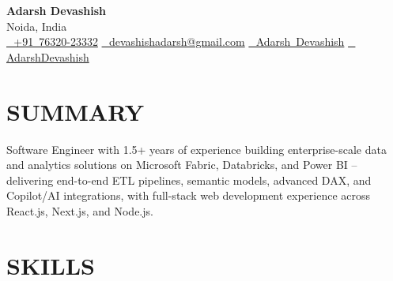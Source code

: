 \documentclass[10pt,letterpaper]{article}
\begin{document}
\begin{center}
    {\LARGE \textbf{Adarsh Devashish}}\\
    \vspace{0.15cm}
    {\small Noida, India}\\
    \vspace{0.2cm}
    \noindent
    \small
    \href{tel:+917632023332}{\raisebox{-0.2\height}{\Large \faPhoneSquare}\ \,+91~76320-23332}\hspace{6pt}
    \href{mailto:devashishadarsh@gmail.com}{\raisebox{-0.2\height}{\large \faEnvelopeSquare}\ \,devashishadarsh@gmail.com}\hspace{6pt}
    \href{https://www.linkedin.com/in/adarsh-devashish-9ba49711b/}{\raisebox{-0.2\height}{\large \faLinkedinSquare}\ \,Adarsh~Devashish}\hspace{6pt}
    \href{https://github.com/AdarshDevashish}{\raisebox{-0.2\height}{\large \faGithubSquare}\ \,AdarshDevashish}

\end{center}

\vspace{-0.2cm}

\section{SUMMARY}

Software Engineer with 1.5+ years of experience building enterprise-scale data and analytics solutions on Microsoft Fabric, Databricks, and Power BI -- delivering end-to-end ETL pipelines, semantic models, advanced DAX, and Copilot/AI integrations, with full-stack web development experience across React.js, Next.js, and Node.js.

\vspace{-0.1cm}

\section{SKILLS}
\vspace{0.05cm}
\small
\end{document}
